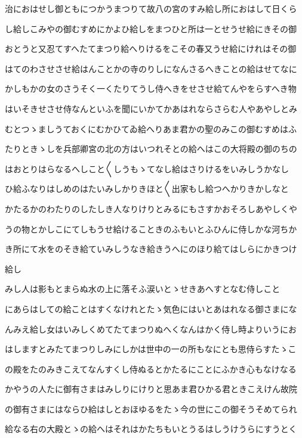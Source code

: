 \documentclass[a4paper,11pt,landscape]{ltjtarticle}
\begin{document}
治におはせし御ともにつかうまつりて故八の宮のすみ給し所におはして日くら
\par\medskip
し給しこみやの御むすめにかよひ給しをまつひと所は一とせうせ給にきその御
\par\medskip
おとうと又忍てすへたてまつり給へりけるをこその春又うせ給にけれはその御
\par\medskip
はてのわさせさせ給はんことかの寺のりしになんさるへきことの給はせてなに
\par\medskip
かしもかの女のさうそく一くたりてうし侍へきをせさせ給てんやをらすへき物
\par\medskip
はいそきせさせ侍なんといふを聞にいかてかあはれならさらむ人やあやしとみ
\par\medskip
むとつゝましうておくにむかひてゐ給へりあま君かの聖のみこの御むすめはふ
\par\medskip
たりときゝしを兵部卿宮の北の方はいつれそとの給へはこの大将殿の御のちの
\par\medskip
はおとりはらなるへしこと〱しうもゝてなし給はさりけるをいみしうかなし
\par\medskip
ひ給ふなりはしめのはたいみしかりきほと〱出家もし給つへかりきかしなと
\par\medskip
かたるかのわたりのしたしき人なりけりとみるにもさすかおそろしあやしくや
\par\medskip
うの物とかしこにてしもうせ給けることきのふもいとふひんに侍しかな河ちか
\par\medskip
き所にて水をのそき給ていみしうなき給きうへにのほり給てはしらにかきつけ
\par\medskip
給し
\par\medskip
みし人は影もとまらぬ水の上に落そふ涙いとゝせきあへすとなむ侍しこと
\par\medskip
にあらはしての給ことはすくなけれとたゝ気色にはいとあはれなる御さまにな
\par\medskip
んみえ給し女はいみしくめてたてまつりぬへくなんはかく侍し時よりいうにお
\par\medskip
はしますとみたてまつりしみにしかは世中の一の所もなにとも思侍らすたゝこ
\par\medskip
の殿をたのみきこえてなんすくし侍ぬるとかたるにことにふかき心もなけなる
\par\medskip
かやうの人たに御有さまはみしりにけりと思あま君ひかる君ときこえけん故院
\par\medskip
の御有さまにはならひ給はしとおほゆるをたゝ今の世にこの御そうそめてられ
\par\medskip
給なる右の大殿とゝの給へはそれはかたちもいとうるはしうけうらにすうとく
\end{document}

